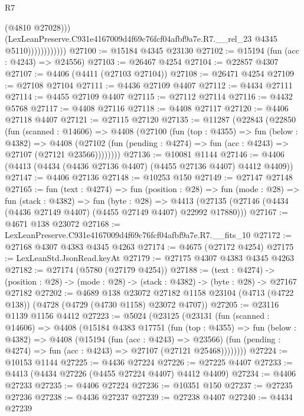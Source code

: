 \begin{lexlean}{R7}
\begin{coremodule}
                              (@4810 @27028)))
                          (LexLeanPreserve.C931e4167009d4f69c76fcf04afbf9a7e.R7.__rel_23
                            @4345
                            @5110))))))))))))
@27100 := @15184 @4345 @23130
@27102 := @15194 (fun (acc : @4243) => @24556)
@27103 := @26467 @4254
@27104 := @22857 @4307
@27107 := @4406 (@4411 (@27103 @27104))
@27108 := @26471 @4254
@27109 := @27108 @27104
@27111 := @4436 @27109 @4407
@27112 := @4434 @27111
@27114 := @4455 @27109 @4407
@27115 := @27112 @27114
@27116 := @4432 @5768
@27117 := @4408 @27116
@27118 := @4408 @27117
@27120 := @4406 @27118 @4407
@27121 := @27115 @27120
@27135 := @11287
    (@22843
      (@22850
        (fun (scanned : @14606) =>
        @4408
          (@27100
            (fun (top : @4355) =>
            fun (below : @4382) =>
            @4408
              (@27102 (fun (pending : @4274) => fun (acc : @4243) => @27107 (@27121 @23566))))))))
@27136 := @10081 @1144
@27146 := @4406 (@4413 (@4434 (@4436 @27136 @4407) (@4455 @27136 @4407) @4412 @4409))
@27147 := @4406 @27136
@27148 := @10253 @150
@27149 := @27147 @27148
@27165 := fun (text : @4274) =>
  fun (position : @28) =>
  fun (mode : @28) =>
  fun (stack : @4382) =>
  fun (byte : @28) =>
  @4413 (@27135 (@27146 (@4434 (@4436 @27149 @4407) (@4455 @27149 @4407) @22992 @17880)))
@27167 := @4671 @138 @23072
@27168 := LexLeanPreserve.C931e4167009d4f69c76fcf04afbf9a7e.R7.__fits_10
@27172 := @27168 @4307 @4383 @4345 @4263
@27174 := @4675 (@27172 @4254)
@27175 := LexLeanStd.JsonRead.keyAt
@27179 := @27175 @4307 @4383 @4345 @4263
@27182 := @27174 (@5780 (@27179 @4254))
@27188 := (text : @4274) ->
  (position : @28) -> (mode : @28) -> (stack : @4382) -> (byte : @28) -> @27167 @27182
@27202 := @4689
    @138
    @23072
    @27182
    @1158
    @23104
    (@4713 (@4722 @138))
    (@4728 (@4729 (@4730 @1158) @23072 @4707))
@27205 := @23116 @1139 @1156 @4412
@27223 := @5024
    (@23125
      (@23131
        (fun (scanned : @14606) =>
        @4408
          (@15184
            @4383
            @17751
            (fun (top : @4355) =>
            fun (below : @4382) =>
            @4408
              (@15194
                (fun (acc : @4243) => @23566)
                (fun (pending : @4274) => fun (acc : @4243) => @27107 (@27121 @25468))))))))
@27224 := @10153 @1144
@27225 := @4436 @27224
@27226 := @27225 @4407
@27233 := @4413 (@4434 @27226 (@4455 @27224 @4407) @4412 @4409)
@27234 := @4406 @27233
@27235 := @4406 @27224
@27236 := @10351 @150
@27237 := @27235 @27236
@27238 := @4436 @27237
@27239 := @27238 @4407
@27240 := @4434 @27239

\end{coremodule}
\end{lexlean}
